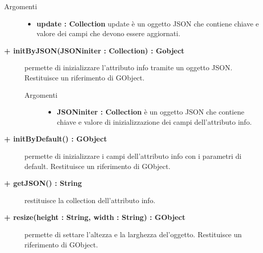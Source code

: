 \begin{description}
\begin{description}
		\begin{description}
			\item[Argomenti] \hfill
				\begin{itemize}
				
					\item \textbf{update : Collection			} \hfill
					update è un oggetto JSON che contiene chiave e valore dei campi che devono essere aggiornati. 
				\end{itemize}
		\end{description}

\end{description}

\begin{description}
		\item[\textbf{\color{blue}+ initByJSON(JSONiniter : Collection) : Gobject			}] \hfill
			permette di inizializzare l'attributo info tramite un oggetto JSON. Restituisce un riferimento di GObject. 
			
		\begin{description}
			\item[Argomenti] \hfill
				\begin{itemize}
				
					\item \textbf{JSONiniter : Collection			} \hfill
					è un oggetto JSON che contiene chiave e valore di inizializzazione dei campi dell'attributo info. 
				\end{itemize}
		\end{description}

\end{description}

\begin{description}
		\item[\textbf{\color{blue}+ initByDefault() : GObject			}] \hfill
			permette di inizializzare i campi dell'attributo info con i parametri di default. Restituisce un riferimento di GObject.

\end{description}

\begin{description}
		\item[\textbf{\color{blue}+ getJSON() : String			}] \hfill
			restituisce la collection dell'attributo info.

\end{description}

\begin{description}
		\item[\textbf{\color{blue}+ resize(height : String, width : String) : GObject			}] \hfill
			permette di settare l'altezza e la larghezza del'oggetto. Restituisce un riferimento di GObject.
			

\end{description}
\end{description}
